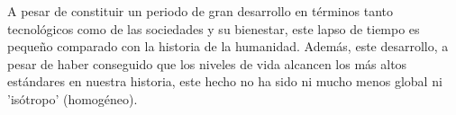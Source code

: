 A pesar de constituir un periodo de gran desarrollo en términos tanto tecnológicos como de las sociedades y su bienestar, este lapso de tiempo es pequeño comparado con la historia de la humanidad. Además, este desarrollo, a pesar de haber conseguido que los niveles de vida alcancen los más altos estándares en nuestra historia, este hecho no ha sido ni mucho menos global ni 'isótropo' (homogéneo). \\







